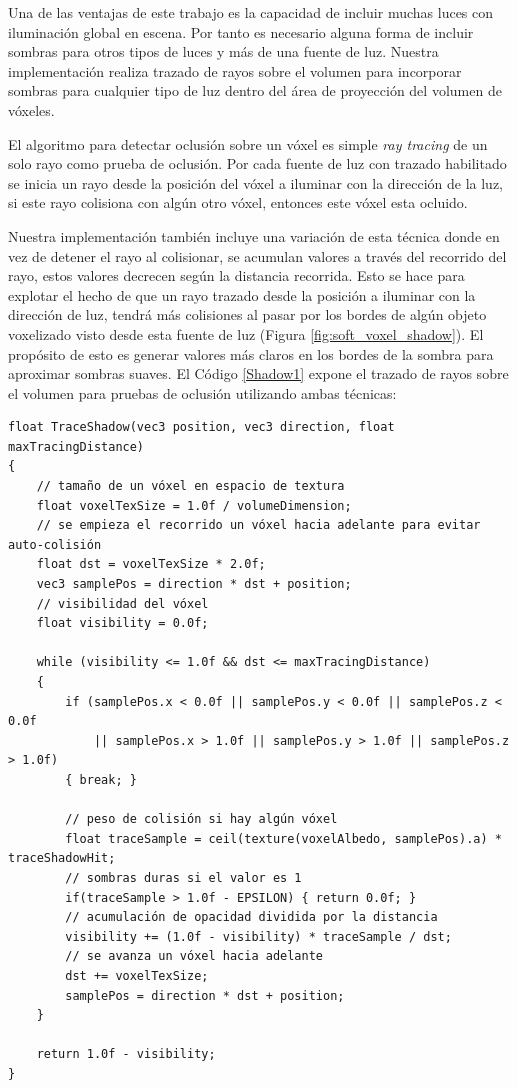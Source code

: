 Una de las ventajas de este trabajo es la capacidad de incluir muchas luces con iluminación global en escena. Por tanto es necesario alguna forma de incluir sombras para otros tipos de luces y más de una fuente de luz. Nuestra implementación realiza trazado de rayos sobre el volumen para incorporar sombras para cualquier tipo de luz dentro del área de proyección del volumen de vóxeles.

El algoritmo para detectar oclusión sobre un vóxel es simple \emph{ray tracing} de un solo rayo como prueba de oclusión. Por cada fuente de luz con trazado habilitado se inicia un rayo desde la posición del vóxel a iluminar con la dirección de la luz, si este rayo colisiona con algún otro vóxel, entonces este vóxel esta ocluido.

Nuestra implementación también incluye una variación de esta técnica donde en vez de detener el rayo al colisionar, se acumulan valores a través del recorrido del rayo, estos valores decrecen según la distancia recorrida. Esto se hace para explotar el hecho de que un rayo trazado desde la posición a iluminar con la dirección de luz, tendrá más colisiones al pasar por los bordes de algún objeto voxelizado visto desde esta fuente de luz (Figura \ref{fig:soft_voxel_shadow}). El propósito de esto es generar valores más claros en los bordes de la sombra para aproximar sombras suaves. El Código \ref{Shadow1} expone el trazado de rayos sobre el volumen para pruebas de oclusión utilizando ambas técnicas:
\\
\begin{lstlisting}[caption={Trazado de rayos sobre volumen albedo para sombras sobre vóxeles}, label=Shadow1]
float TraceShadow(vec3 position, vec3 direction, float maxTracingDistance) 
{
    // tamaño de un vóxel en espacio de textura
    float voxelTexSize = 1.0f / volumeDimension;
    // se empieza el recorrido un vóxel hacia adelante para evitar auto-colisión
    float dst = voxelTexSize * 2.0f;
    vec3 samplePos = direction * dst + position;
    // visibilidad del vóxel
    float visibility = 0.0f;

    while (visibility <= 1.0f && dst <= maxTracingDistance) 
    {
        if (samplePos.x < 0.0f || samplePos.y < 0.0f || samplePos.z < 0.0f
            || samplePos.x > 1.0f || samplePos.y > 1.0f || samplePos.z > 1.0f) 
        { break; }
        
        // peso de colisión si hay algún vóxel
        float traceSample = ceil(texture(voxelAlbedo, samplePos).a) * traceShadowHit;
        // sombras duras si el valor es 1
        if(traceSample > 1.0f - EPSILON) { return 0.0f; }
        // acumulación de opacidad dividida por la distancia
        visibility += (1.0f - visibility) * traceSample / dst;
        // se avanza un vóxel hacia adelante
        dst += voxelTexSize;
        samplePos = direction * dst + position;
    }

    return 1.0f - visibility;
}
\end{lstlisting}

